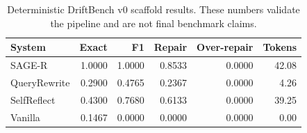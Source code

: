 \begin{table}[t]
\centering
\scriptsize
\setlength{\tabcolsep}{3pt}
\begin{tabular}{lrrrrr}
\toprule
System & Exact & F1 & Repair & Over-repair & Tokens \\
\midrule
SAGE-R & 1.0000 & 1.0000 & 0.8533 & 0.0000 & 42.08 \\
QueryRewrite & 0.2900 & 0.4765 & 0.2367 & 0.0000 & 4.26 \\
SelfReflect & 0.4300 & 0.7680 & 0.6133 & 0.0000 & 39.25 \\
Vanilla & 0.1467 & 0.0000 & 0.0000 & 0.0000 & 0.00 \\
\bottomrule
\end{tabular}
\caption{Deterministic DriftBench v0 scaffold results. These numbers validate the pipeline and are not final benchmark claims.}
\label{tab:v0-main}
\end{table}
